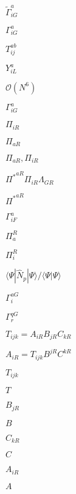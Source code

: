 \documentclass{article}
\begin{document}
$\tilde\Gamma^a_{iG}$
\pagebreak

$\Gamma^a_{iG}$
\pagebreak

$T_{ij}^{ab}$
\pagebreak

$Y^a_{iL}$
\pagebreak

$ \mathcal{O}(N^{6}) $
\pagebreak

$\Gamma_{iG}^a$
\pagebreak

$\Pi_{iR}$
\pagebreak

$\Pi_{aR}$
\pagebreak

$\Pi_{aR},\Pi_{iR}$
\pagebreak

${\Pi^\ast}^{aR}\Pi_{iR}\Lambda_{GR}$
\pagebreak

${\Pi^\ast}^{aR}$
\pagebreak

$\Gamma^a_{iF}$
\pagebreak

$\Pi^R_a$
\pagebreak

$\Pi^R_i$
\pagebreak

$\langle\Psi|\hat N_p|\Psi\rangle/\langle\Psi|\Psi\rangle$
\pagebreak

$\Gamma^{aG}_i$
\pagebreak

$\Gamma^{qG}_r$
\pagebreak

$T_{ijk}=A_{iR}B_{jR}C_{kR}$
\pagebreak

$A_{iR} = T_{ijk}B^{jR}C^{kR}$
\pagebreak

$T_{ijk}$
\pagebreak

$T$
\pagebreak

$B_{jR}$
\pagebreak

$B$
\pagebreak

$C_{kR}$
\pagebreak

$C$
\pagebreak

$A_{iR}$
\pagebreak

$A$
\pagebreak
\end{document}
